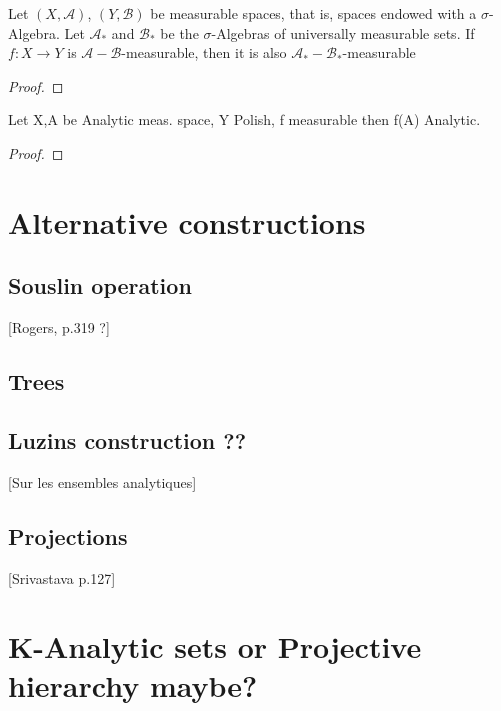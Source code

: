 \documentclass[10pt, a4paper, titlepage]{article}
\numberwithin{equation}{section}
\begin{document}
\begin{theorem}
	Let $(X,\mathcal{A})$,  $\left( Y, \mathcal{B} \right) $ be measurable spaces, that is, spaces endowed with a $\sigma$-Algebra.  
	Let $\mathcal{A}_*$ and $\mathcal{B}_*$ be the $\sigma$-Algebras of universally measurable sets.
	If  $f:X \to Y$ is  $\mathcal{A}- \mathcal{B}$-measurable, then it is also $\mathcal{A}_*-\mathcal{B}_*$-measurable
\end{theorem}
\begin{proof}
	
\end{proof}

\begin{definition}
	
\end{definition}

\begin{theorem}
	Let X,A be Analytic meas. space, Y Polish, f measurable then f(A) Analytic.
\end{theorem}
\begin{proof}
	
\end{proof}



\section{Alternative constructions}
\label{constructions}

\subsection{Souslin operation}
[Rogers, p.319 ?]


\subsection{Trees}

\subsection{Luzins construction ??}
[Sur les ensembles analytiques]


\subsection{Projections}
[Srivastava p.127]


\section{K-Analytic sets or Projective hierarchy maybe?}































\vspace{\fill}
\printbibliography{}
\end{document}
